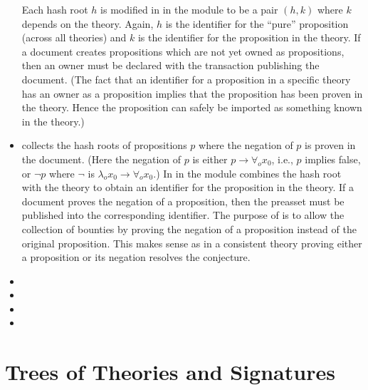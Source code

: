 \begin{itemize}
Each hash root $h$ is modified in {} in the module {}
to be a pair $(h,k)$ where $k$ depends on the theory.
Again, $h$ is the identifier for the ``pure'' proposition (across all theories)
and $k$ is the identifier for the proposition in the theory.
If a document creates propositions which are not yet owned as propositions, then an
owner must be declared with the transaction publishing the document.
(The fact that an identifier for a proposition in a specific theory has an owner as a proposition
implies that the proposition has been proven in the theory. Hence the proposition can safely
be imported as something known in the theory.)
\item {} collects the hash roots of propositions $p$
 where the negation of $p$ is proven in the document.
 (Here the negation of $p$ is either $p\to\forall_o x_0$, i.e., $p$ implies false,
 or $\neg p$ where $\neg$ is $\lambda_o x_0\to\forall_o x_0$.)
 In {} in the module {} combines the hash
 root with the theory to obtain an identifier for the proposition in the theory.
 If a document proves the negation of a proposition, then the {}
 preasset must be published into the corresponding identifier.
 The purpose of {} is to allow the collection of bounties by
 proving the negation of a proposition instead of the original proposition.
 This makes sense as in a consistent theory proving either a proposition or its negation
 resolves the conjecture.
\item {}
\item {}
\item {}
\item {}
\end{itemize}

\section{Trees of Theories and Signatures}

